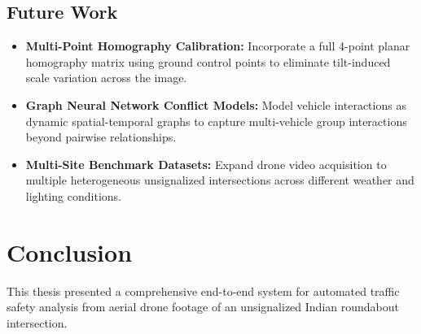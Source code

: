 \documentclass[12pt,a4paper]{report}
\begin{document}
\section{Future Work}

\begin{itemize}
    \item \textbf{Multi-Point Homography Calibration:} Incorporate a full 4-point planar homography matrix using ground control
          points to eliminate tilt-induced scale variation across the image.
    \item \textbf{Graph Neural Network Conflict Models:} Model vehicle interactions as dynamic spatial-temporal graphs
          to capture multi-vehicle group interactions beyond pairwise relationships.
    \item \textbf{Multi-Site Benchmark Datasets:} Expand drone video acquisition to multiple heterogeneous unsignalized
          intersections across different weather and lighting conditions.
\end{itemize}
\clearpage\thispagestyle{empty}\newpage

\chapter{Conclusion}
\label{chap:conclusion}

This thesis presented a comprehensive end-to-end system for automated traffic safety analysis from aerial drone footage of an unsignalized Indian roundabout intersection.
\end{document}
